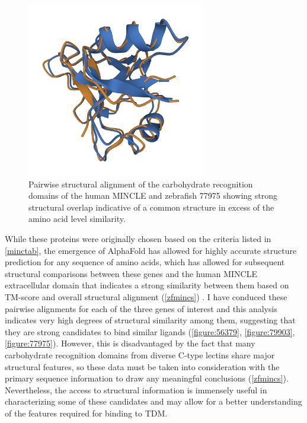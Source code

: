 \begin{figure}
\centering
\includegraphics[height=3in]{images/77975_align.png}
\caption[Structural alignment of MINCLE and 77975]{Pairwise structural alignment of the carbohydrate recognition domains of the human MINCLE and zebrafish 77975 showing strong structural overlap indicative of a common structure in excess of the amino acid level similarity.}
\label{figure:77975}
\end{figure}

While these proteins were originally chosen based on the criteria listed in \autoref{minctab}, the emergence of AlphaFold has allowed for highly accurate structure prediction for any sequence of amino acids, which has allowed for subsequent structural comparisons between these genes and the human MINCLE extracellular domain that indicates a strong similarity between them based on TM\hyp{}score and overall structural alignment (\autoref{zfmincs}) \citep{Jumper2021}. I have conduced these pairwise alignments for each of the three genes of interest and this analysis indicates very high degrees of structural similarity among them, suggesting that they are strong candidates to bind similar ligands (\autoref{figure:56379}, \autoref{figure:79903}, \autoref{figure:77975}). However, this is disadvantaged by the fact that many carbohydrate recognition domains from diverse C\hyp{}type lectins share major structural features, so these data must be taken into consideration with the primary sequence information to draw any meaningful conclusions (\autoref{zfmincs}). Nevertheless, the access to structural information is immensely useful in characterizing some of these candidates and may allow for a better understanding of the features required for binding to TDM.


